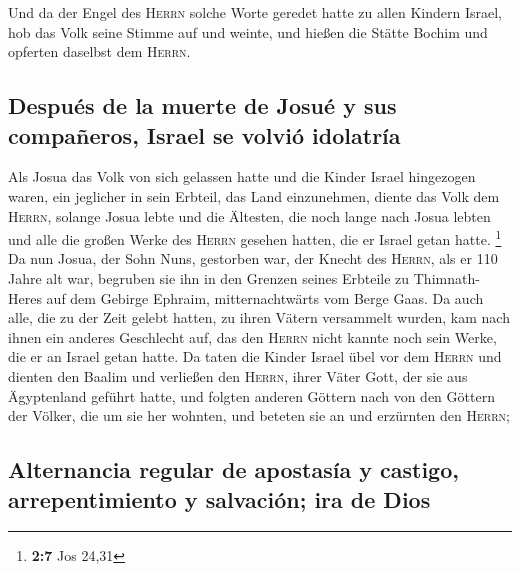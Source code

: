  Und da der Engel des \textsc{Herrn} solche Worte geredet
hatte zu allen Kindern Israel, hob das Volk seine Stimme auf und weinte,
 und hießen die Stätte Bochim und opferten daselbst dem
\textsc{Herrn}.

\hypertarget{despuuxe9s-de-la-muerte-de-josuuxe9-y-sus-compauxf1eros-israel-se-volviuxf3-idolatruxeda}{%
\subsection{Después de la muerte de Josué y sus compañeros, Israel se
volvió
idolatría}\label{despuuxe9s-de-la-muerte-de-josuuxe9-y-sus-compauxf1eros-israel-se-volviuxf3-idolatruxeda}}

 Als Josua das Volk von sich gelassen hatte und die Kinder
Israel hingezogen waren, ein jeglicher in sein Erbteil, das Land
einzunehmen,  diente das Volk dem \textsc{Herrn}, solange
Josua lebte und die Ältesten, die noch lange nach Josua lebten und alle
die großen Werke des \textsc{Herrn} gesehen hatten, die er Israel getan
hatte. \footnote{\textbf{2:7} Jos 24,31}  Da nun Josua,
der Sohn Nuns, gestorben war, der Knecht des \textsc{Herrn}, als er 110
Jahre alt war,  begruben sie ihn in den Grenzen seines
Erbteile zu Thimnath-Heres auf dem Gebirge Ephraim, mitternachtwärts vom
Berge Gaas.  Da auch alle, die zu der Zeit gelebt hatten,
zu ihren Vätern versammelt wurden, kam nach ihnen ein anderes Geschlecht
auf, das den \textsc{Herrn} nicht kannte noch sein Werke, die er an
Israel getan hatte.  Da taten die Kinder Israel übel vor
dem \textsc{Herrn} und dienten den Baalim  und verließen
den \textsc{Herrn}, ihrer Väter Gott, der sie aus Ägyptenland geführt
hatte, und folgten anderen Göttern nach von den Göttern der Völker, die
um sie her wohnten, und beteten sie an und erzürnten den \textsc{Herrn};

\hypertarget{alternancia-regular-de-apostasuxeda-y-castigo-arrepentimiento-y-salvaciuxf3n-ira-de-dios}{%
\subsection{Alternancia regular de apostasía y castigo, arrepentimiento
y salvación; ira de
Dios}\label{alternancia-regular-de-apostasuxeda-y-castigo-arrepentimiento-y-salvaciuxf3n-ira-de-dios}}

